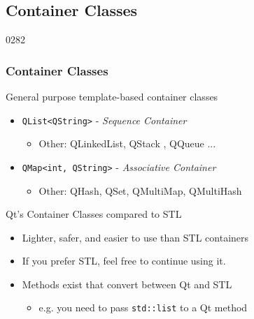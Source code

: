 %
%
%
%

\subsection{Container Classes}


\begin{slide}{0282}\frametitle{Container Classes}
  General purpose template-based container classes
  \begin{itemize}
  \item \lstinline!QList<QString>! - \textit{Sequence Container}
    \begin{itemize}
    \item Other: QLinkedList, QStack , QQueue ...
    \end{itemize}
  \item \lstinline!QMap<int, QString>! - \textit{Associative Container}
    \begin{itemize}
    \item Other: QHash, QSet, QMultiMap, QMultiHash
    \end{itemize}
  \end{itemize}
  \medskip  Qt's Container Classes compared to STL
  \begin{itemize}
  \item Lighter, safer, and easier to use than STL containers
  \item If you prefer STL, feel free to continue using it.
  \item Methods exist that convert between Qt and STL
    \begin{itemize}
    \item e.g. you need to pass \texttt{std::list} to a Qt method
    \end{itemize}
  \end{itemize}
\end{slide}

